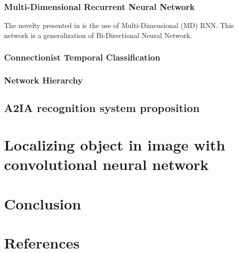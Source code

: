 \documentclass[11pt]{sdm}
\begin{document}
\subsubsection{Multi-Dimensional Recurrent Neural Network}

The novelty presented in \cite{graves_offline_2009} is the use of Multi-Dimensional (MD) RNN.
This network is a generalization of Bi-Directional Neural Network.

\subsubsection{Connectionist Temporal Classification}

\subsubsection{Network Hierarchy}

\subsection{A2IA recognition system proposition}

\section{Localizing object in image with convolutional neural network}

\section{Conclusion}

\section*{References}



\end{document}
